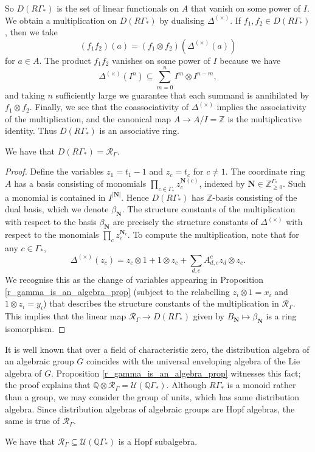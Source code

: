 \documentclass[ALCO,Unicode]{cedram}
\newcommand{\RGamma}{\mathcal{R}_{\Gamma}}
\newcommand{\RGamma}{\mathcal{R}_{\Gamma}}
\begin{document}
So $D(R\Gamma_*)$ is the set of linear functionals on $A$ that vanish on some power of $I$. We obtain a multiplication on $D(R\Gamma_*)$ by dualising $\Delta^{(\times)}$. If $f_1, f_2 \in D(R\Gamma_*)$, then we take
\[
(f_1f_2)(a) = (f_1 \otimes f_2)(\Delta^{(\times)}(a))
\]
for $a \in A$. The product $f_1f_2$ vanishes on some power of $I$ because we have
\[
\Delta^{(\times)}(I^n) \subseteq \sum_{m=0}^n I^m \otimes I^{n-m},
\]
and taking $n$ sufficiently large we guarantee that each summand is annihilated by $f_1 \otimes f_2$. Finally, we see that the coassociativity of $\Delta^{(\times)}$ implies the associativity of the multiplication, and the canonical map $A \to A/I = \mathbb{Z}$ is the multiplicative identity. Thus $D(R\Gamma_*)$ is an associative ring.
\begin{theorem} \label{dist_thm}
We have that $D(R\Gamma_*) = \RGamma$. 
\end{theorem}
\begin{proof}
Define the variables $z_1 = t_1 - 1$ and $z_c = t_c$ for $c \neq 1$. The coordinate ring $A$ has a basis consisting of monomials $\prod_{c \in \Gamma_*} z_c^{\mathbf{N}(c)}$, indexed by $\mathbf{N} \in \mathbb{Z}_{\geq 0}^{\Gamma_*}$. Such a monomial is contained in $I^{|\mathbf{N}|}$. Hence $D(R\Gamma_*)$ has $\mathbb{Z}$-basis consisting of the dual basis, which we denote $\beta_{\mathbf{N}}$. The structure constants of the multiplication with respect to the basis $\beta_{\mathbf{N}}$ are precisely the structure constants of $\Delta^{(\times)}$ with respect to the monomials $\prod_c z_c^{\mathbf{N}_c}$. To compute the multiplication, note that for any $c \in \Gamma_*$,
\[
\Delta^{(\times)} (z_c) = z_c \otimes 1 + 1 \otimes z_c + \sum_{d,e}A_{d,e}^c z_d \otimes z_e.
\]
We recognise this as the change of variables appearing in Proposition \ref{r_gamma_is_an_algebra_prop} (subject to the relabelling $z_i \otimes 1 = x_i$ and $1 \otimes z_i = y_i$) that describes the structure constants of the multiplication in $\RGamma$. This implies that the linear map $\RGamma \to D(R\Gamma_*)$ given by $B_{\mathbf{N}} \mapsto \beta_{\mathbf{N}}$ is a ring isomorphism.
\end{proof}

It is well known that over a field of characteristic zero, the distribution algebra of an algebraic group $G$ coincides with the universal enveloping algebra of the Lie algebra of $G$. Proposition \ref{r_gamma_is_an_algebra_prop} witnesses this fact; the proof explains that $\mathbb{Q} \otimes \RGamma = \mathcal{U}(\mathbb{Q}\Gamma_*)$. Although $R\Gamma_*$ is a monoid rather than a group, we may consider the group of units, which has same distribution algebra. Since distribution algebras of algebraic groups are Hopf algebras, the same is true of $\RGamma$.
\begin{proposition}
We have that $\RGamma \subseteq \mathcal{U}(\mathbb{Q}\Gamma_*)$ is a Hopf subalgebra.
\end{proposition}
\end{document}
